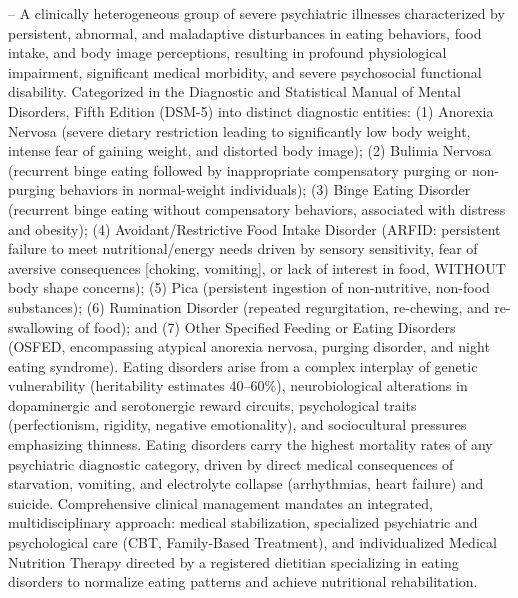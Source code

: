 -- A clinically heterogeneous group of severe psychiatric illnesses characterized by persistent, abnormal, and maladaptive disturbances in eating behaviors, food intake, and body image perceptions, resulting in profound physiological impairment, significant medical morbidity, and severe psychosocial functional disability. Categorized in the Diagnostic and Statistical Manual of Mental Disorders, Fifth Edition (DSM-5) into distinct diagnostic entities: (1) Anorexia Nervosa (severe dietary restriction leading to significantly low body weight, intense fear of gaining weight, and distorted body image); (2) Bulimia Nervosa (recurrent binge eating followed by inappropriate compensatory purging or non-purging behaviors in normal-weight individuals); (3) Binge Eating Disorder (recurrent binge eating without compensatory behaviors, associated with distress and obesity); (4) Avoidant/Restrictive Food Intake Disorder (ARFID: persistent failure to meet nutritional/energy needs driven by sensory sensitivity, fear of aversive consequences [choking, vomiting], or lack of interest in food, WITHOUT body shape concerns); (5) Pica (persistent ingestion of non-nutritive, non-food substances); (6) Rumination Disorder (repeated regurgitation, re-chewing, and re-swallowing of food); and (7) Other Specified Feeding or Eating Disorders (OSFED, encompassing atypical anorexia nervosa, purging disorder, and night eating syndrome). Eating disorders arise from a complex interplay of genetic vulnerability (heritability estimates 40--60\%), neurobiological alterations in dopaminergic and serotonergic reward circuits, psychological traits (perfectionism, rigidity, negative emotionality), and sociocultural pressures emphasizing thinness. Eating disorders carry the highest mortality rates of any psychiatric diagnostic category, driven by direct medical consequences of starvation, vomiting, and electrolyte collapse (arrhythmias, heart failure) and suicide. Comprehensive clinical management mandates an integrated, multidisciplinary approach: medical stabilization, specialized psychiatric and psychological care (CBT, Family-Based Treatment), and individualized Medical Nutrition Therapy directed by a registered dietitian specializing in eating disorders to normalize eating patterns and achieve nutritional rehabilitation.

